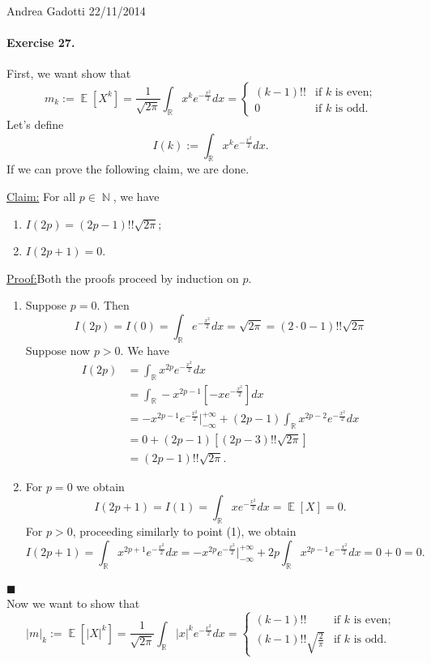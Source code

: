 \documentclass[12pt,a4paper]{report}
\theoremstyle{definition}
\theoremstyle{num.custom-title}
\newenvironment{claim}[1]{\par\noindent\underline{Claim:}\space#1}{} %
\newenvironment{claimproof}[1]{\par\noindent\underline{Proof:}\space#1}{\leavevmode\unskip\penalty9999 \hbox{}\nobreak\hfill\quad\hbox{$\blacksquare$}} %
\DeclareMathOperator{\N}{\mathbb{N}}
\DeclareMathOperator{\E}{\mathbb{E}}
\newcommand{\R}{\mathbb{R}}
\renewcommand{\1}{\mathbbm{1}}
\begin{document}
\noindent Andrea Gadotti \hfill 22/11/2014

\paragraph{Exercise 27.} First, we want show that
\[
m_k := \E[X^k] = \frac{1}{\sqrt{2\pi}} \int_\R x^k e^{-\frac{x^2}{2}} dx =
\begin{cases}
(k-1)!! & \text{if $k$ is even;}\\
0 & \text{if $k$ is odd.}
\end{cases}
\]
Let's define
\[
I(k):= \int_\R x^k e^{-\frac{x^2}{2}} dx.
\]
If we can prove the following claim, we are done.
\begin{claim}{}
For all $p \in \N$, we have 
\begin{enumerate}
\item $I(2p)=(2p-1)!!\sqrt{2\pi}$;
\item $I(2p+1)=0$. 
\end{enumerate}
\begin{claimproof} Both the proofs proceed by induction on $p$.
\begin{enumerate}
\item Suppose $p=0$. Then 
\[
I(2p)=I(0)= \int_\R e^{-\frac{x^2}{2}} dx = \sqrt{2\pi} = (2\cdot 0 -1)!!\sqrt{2\pi}
\]
Suppose now $p>0$. We have
\begin{align*}
I(2p) 
&= \int_\R x^{2p} e^{-\frac{x^2}{2}} dx\\
&= \int_\R -x^{2p-1} \left[ -x e^{-\frac{x^2}{2}} \right] dx\\
&= -x^{2p-1} e^{-\frac{x^2}{2}} \Bigg|_{-\infty}^{+\infty} + (2p-1) \int_\R x^{2p-2} e^{-\frac{x^2}{2}} dx\\
&=0 + (2p-1) [(2p-3)!! \sqrt{2\pi}]\\
&= (2p-1)!!\sqrt{2\pi}.
\end{align*}
\item For $p=0$ we obtain
\[
I(2p+1)=I(1)= \int_\R x e^{-\frac{x^2}{2}} dx = \E[X] = 0.
\]
For $p>0$, proceeding similarly to point (1), we obtain
\[
I(2p+1)= \int_\R x^{2p+1} e^{-\frac{x^2}{2}} dx = -x^{2p} e^{-\frac{x^2}{2}} \Bigg|_{-\infty}^{+\infty} + 2p \int_\R x^{2p-1} e^{-\frac{x^2}{2}} dx = 0+0=0.
\]
\end{enumerate}
\end{claimproof}
\end{claim}\ \\
Now we want to show that
\[
|m|_k := \E[|X|^k] = \frac{1}{\sqrt{2\pi}} \int_\R |x|^k e^{-\frac{x^2}{2}} dx =
\begin{cases}
(k-1)!! & \text{if $k$ is even;}\\
(k-1)!!\sqrt{\frac{2}{\pi}} & \text{if $k$ is odd.}
\end{cases}
\]
\end{document}
